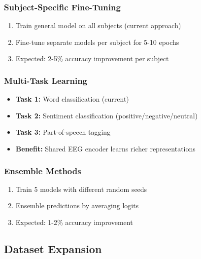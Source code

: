 \documentclass[12pt,a4paper]{article}
\begin{document}
\subsubsection{Subject-Specific Fine-Tuning}
\begin{enumerate}
    \item Train general model on all subjects (current approach)
    \item Fine-tune separate models per subject for 5-10 epochs
    \item Expected: 2-5\% accuracy improvement per subject
\end{enumerate}

\subsubsection{Multi-Task Learning}
\begin{itemize}
    \item \textbf{Task 1:} Word classification (current)
    \item \textbf{Task 2:} Sentiment classification (positive/negative/neutral)
    \item \textbf{Task 3:} Part-of-speech tagging
    \item \textbf{Benefit:} Shared EEG encoder learns richer representations
\end{itemize}

\subsubsection{Ensemble Methods}
\begin{enumerate}
    \item Train 5 models with different random seeds
    \item Ensemble predictions by averaging logits
    \item Expected: 1-2\% accuracy improvement
\end{enumerate}

\subsection{Dataset Expansion}
\end{document}
